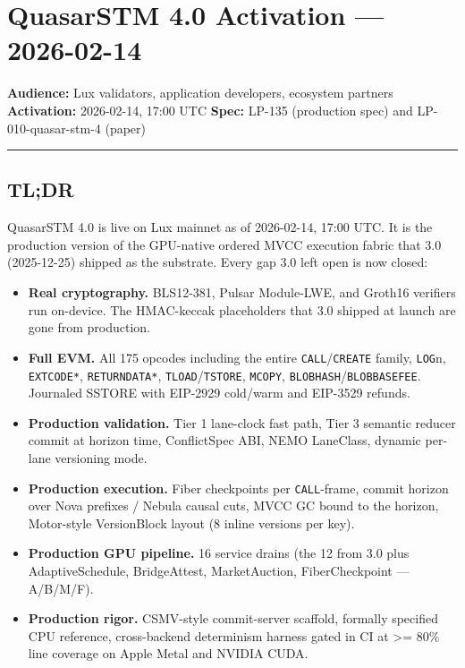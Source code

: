 \documentclass[
]{article}
\author{}
\date{}
\providecommand{\tightlist}{%
  \setlength{\itemsep}{0pt}\setlength{\parskip}{0pt}}
\begin{document}
\section{QuasarSTM 4.0 Activation ---
2026-02-14}\label{quasarstm-40-activation--2026-02-14}

\textbf{Audience:} Lux validators, application developers, ecosystem
partners \textbf{Activation:} 2026-02-14, 17:00 UTC \textbf{Spec:}
LP-135 (production spec) and LP-010-quasar-stm-4 (paper)

\begin{center}\rule{0.5\linewidth}{0.5pt}\end{center}

\subsection{TL;DR}\label{tldr}

QuasarSTM 4.0 is live on Lux mainnet as of 2026-02-14, 17:00 UTC. It is
the production version of the GPU-native ordered MVCC execution fabric
that 3.0 (2025-12-25) shipped as the substrate. Every gap 3.0 left open
is now closed:

\begin{itemize}
\tightlist
\item
  \textbf{Real cryptography.} BLS12-381, Pulsar Module-LWE, and Groth16
  verifiers run on-device. The HMAC-keccak placeholders that 3.0 shipped
  at launch are gone from production.
\item
  \textbf{Full EVM.} All 175 opcodes including the entire
  \texttt{CALL}/\texttt{CREATE} family, \texttt{LOG}n,
  \texttt{EXTCODE*}, \texttt{RETURNDATA*},
  \texttt{TLOAD}/\texttt{TSTORE}, \texttt{MCOPY},
  \texttt{BLOBHASH}/\texttt{BLOBBASEFEE}. Journaled SSTORE with EIP-2929
  cold/warm and EIP-3529 refunds.
\item
  \textbf{Production validation.} Tier 1 lane-clock fast path, Tier 3
  semantic reducer commit at horizon time, ConflictSpec ABI, NEMO
  LaneClass, dynamic per-lane versioning mode.
\item
  \textbf{Production execution.} Fiber checkpoints per
  \texttt{CALL}-frame, commit horizon over Nova prefixes / Nebula causal
  cuts, MVCC GC bound to the horizon, Motor-style VersionBlock layout (8
  inline versions per key).
\item
  \textbf{Production GPU pipeline.} 16 service drains (the 12 from 3.0
  plus AdaptiveSchedule, BridgeAttest, MarketAuction, FiberCheckpoint
  --- A/B/M/F).
\item
  \textbf{Production rigor.} CSMV-style commit-server scaffold, formally
  specified CPU reference, cross-backend determinism harness gated in CI
  at \textgreater= 80\% line coverage on Apple Metal and NVIDIA CUDA.
\end{itemize}
\end{document}
